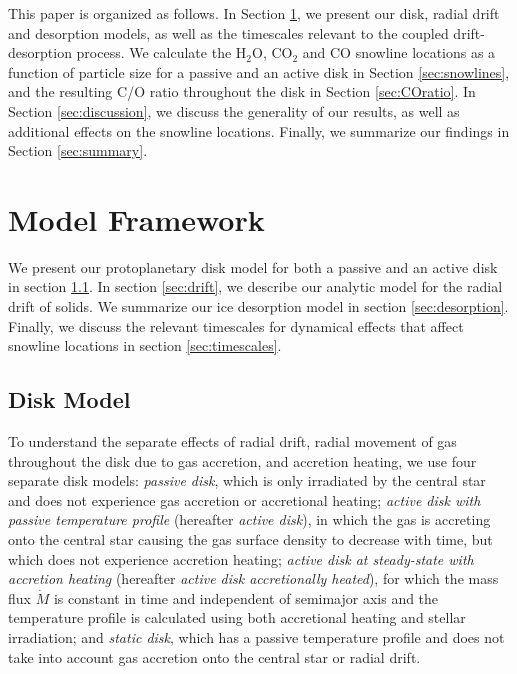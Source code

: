 \documentclass[apj]{emulateapj}
\begin{document}
This paper is organized as follows. In Section \ref{sec:model}, we present our disk, radial drift and desorption models, as well as the timescales relevant to the coupled drift-desorption process. We calculate the H$_2$O, CO$_2$ and CO snowline locations as a function of particle size for a passive and an active disk in Section \ref{sec:snowlines}, and the resulting C/O ratio throughout the disk in Section \ref{sec:COratio}. In Section \ref{sec:discussion}, we discuss the generality of our results, as well as additional effects on the snowline locations. Finally, we summarize our findings in Section \ref{sec:summary}.

\section{Model Framework} 
\label{sec:model}

We present our protoplanetary disk model for both a passive and an active disk in section \ref{sec:disk}. In section \ref{sec:drift}, we describe our analytic model for the radial drift of solids. We summarize our ice desorption model in section \ref{sec:desorption}. Finally, we discuss the relevant timescales for dynamical effects that affect snowline locations %
in section \ref{sec:timescales}.

\subsection{Disk Model}
\label{sec:disk}

To understand the separate effects of radial drift, radial movement of gas throughout the disk due to gas accretion, and accretion heating, we use four separate disk models:  \textit{passive disk}, which is only irradiated by the central star and does not experience gas accretion or accretional heating; \textit{active disk with passive temperature profile} (hereafter \textit{active disk}), in which the gas is accreting onto the central star causing the gas surface density to decrease with time, but which does not experience accretion heating; \textit{active disk at steady-state with accretion heating} (hereafter \textit{active disk accretionally heated}), for which the mass flux $\dot{M}$ is constant in time and independent of semimajor axis and the temperature profile is calculated using both accretional heating and stellar irradiation; and \textit{static disk}, which has a passive temperature profile and does not take into account gas accretion onto the central star or radial drift.
\end{document}
